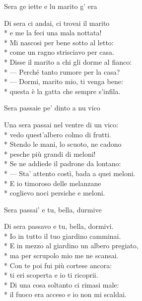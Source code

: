 \documentclass[11pt]{book}
\begin{document}
\begin{poem}{Sera ge iette e lu marito g’ era}{}
\settowidth{\versewidth}{Disse il marito a chi gli dorme al fianco}
\begin{altverse}
Di sera ci andai, ci trovai il marito\\*
e me la feci una mala nottata!\\*
Mi nascosi per bene sotto al letto:\\*
come un ragno strisciavo per casa.\\*
Disse il marito a chi gli dorme al fianco:\\*
— Perché tanto rumore per la casa?\\*
— Dormi, marito mio, ti venga bene:\\*
questa è la gatta che sempre s’infila.
\end{altverse}
\end{poem}

\begin{poem}{Sera passaie pe’ dinto a nu vico}{}
\settowidth{\versewidth}{— Sta’ attento costì, bada a quei meloni}
\begin{altverse}
Una sera passai nel ventre di un vico:\\*
vedo quest’albero colmo di frutti.\\*
Stendo le mani, lo scuoto, ne cadono\\*
pesche più grandi di meloni!\\*
Se ne addiede il padrone da lontano:\\*
— Sta’ attento costì, bada a quei meloni.\\*
E io timoroso delle melanzane\\*
coglievo noci persiche e meloni.
\end{altverse}
\end{poem}

\begin{poem}{Sera passai’ e tu, bella, durmive}{}
\settowidth{\versewidth}{E in mezzo al giardino un albero pregiato}
\begin{altverse}
Di sera passavo e tu, bella, dormivi.\\*
Io in tutto il tuo giardino camminai.\\*
E in mezzo al giardino un albero pregiato,\\*
ma per scrupolo mio me ne scansai.\\*
Con te poi fui più cortese ancora:\\*
ti eri scoperta e io ti ricoprii.\\*
Di una cosa soltanto ci rimasi male:\\*
il fuoco era acceso e io non mi scaldai.
\end{altverse}
\end{poem}
\end{document}
